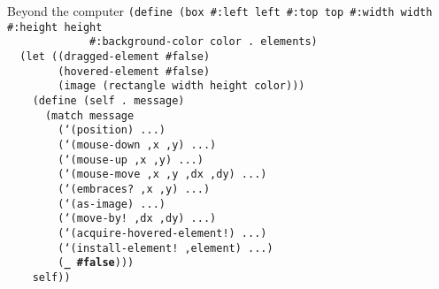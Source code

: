 \begin{frame}{Beyond the computer}
  \tiny
  \texttt{(define (box \#:left left \#:top top \#:width width \#:height height\\
    \ \ \ \ \ \ \ \ \ \ \ \ \ \#:background-color color .\ elements)\\
    \ \ (let ((dragged-element \#false)\\
    \ \ \ \ \ \ \ \ (hovered-element \#false)\\
    \ \ \ \ \ \ \ \ (image (rectangle width height color)))\\
    \ \ \ \ (define (self .\ message)\\
    \ \ \ \ \ \ (match message\\
    \ \ \ \ \ \ \ \ (`(position) ...)\\
    \ \ \ \ \ \ \ \ (`(mouse-down ,x ,y) ...)\\
    \ \ \ \ \ \ \ \ (`(mouse-up ,x ,y) ...)\\
    \ \ \ \ \ \ \ \ (`(mouse-move ,x ,y ,dx ,dy) ...)\\
    \ \ \ \ \ \ \ \ (`(embraces?\ ,x ,y) ...)\\
    \ \ \ \ \ \ \ \ (`(as-image) ...)\\
    \ \ \ \ \ \ \ \ (`(move-by!\ ,dx ,dy) ...)\\
    \ \ \ \ \ \ \ \ (`(acquire-hovered-element!) ...)\\
    \ \ \ \ \ \ \ \ (`(install-element!\ ,element) ...)\\
    \ \ \ \ \ \ \ \ (\textbf{\_ \#false})))\\
    \ \ \ \ self))} \\
  \ \\ \ \\ \ \\ \ \\ \ \\ \ \\ \ \\ \ \\ \ \\ \ \\ \ 
\end{frame}


